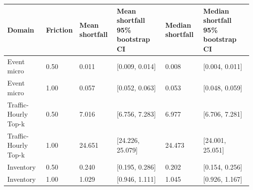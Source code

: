 \begin{tabular}{llllll}
\toprule
Domain & Friction & Mean shortfall & Mean shortfall 95\% bootstrap CI & Median shortfall & Median shortfall 95\% bootstrap CI \\
\midrule
Event micro & 0.50 & 0.011 & [0.009, 0.014] & 0.008 & [0.004, 0.011] \\
Event micro & 1.00 & 0.057 & [0.052, 0.063] & 0.053 & [0.048, 0.059] \\
Traffic-Hourly Top-k & 0.50 & 7.016 & [6.756, 7.283] & 6.977 & [6.706, 7.281] \\
Traffic-Hourly Top-k & 1.00 & 24.651 & [24.226, 25.079] & 24.473 & [24.001, 25.051] \\
Inventory & 0.50 & 0.240 & [0.195, 0.286] & 0.202 & [0.154, 0.256] \\
Inventory & 1.00 & 1.029 & [0.946, 1.111] & 1.045 & [0.926, 1.167] \\
\bottomrule
\end{tabular}
